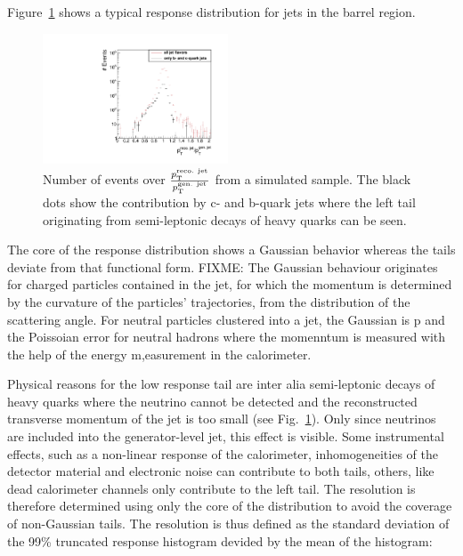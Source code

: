 \mbox{Figure~\ref{res:fig:TypicalResponse}} shows a typical response distribution for jets in the barrel region.
\begin{figure}[b]
  \centering
      \includegraphics[width=0.49\textwidth]{figures/resolution/generalApproach/intrinsicExampleContributionofBCQuarks.pdf}
  \caption{Number of events over $\frac{p_{\text{T}}^{\text{reco. jet}}}{p_{\text{T}}^{\text{gen. jet}}}$ from a simulated \GAMJET sample. 
           The black dots show the contribution by c- and b-quark jets where the left tail originating from semi-leptonic decays of heavy quarks can be seen.}  
  \label{res:fig:TypicalResponse}
\end{figure}
The core of the response distribution shows a Gaussian behavior whereas the tails deviate from that functional form.
FIXME: The Gaussian behaviour originates for charged particles contained in the jet, for which the momentum is determined by the curvature of the particles' trajectories, from the distribution of the scattering angle. 
For neutral particles clustered into a jet, the Gaussian is p and the Poissoian error for neutral hadrons where the momenntum is measured with the help of the energy m,easurement in the calorimeter.

Physical reasons for the low response tail are inter alia semi-leptonic decays of heavy quarks where the neutrino cannot be detected and the reconstructed transverse momentum of the jet is too small (see \mbox{Fig.~\ref{res:fig:TypicalResponse}}). 
Only since neutrinos are included into the generator-level jet, this effect is visible.
Some instrumental effects, such as a non-linear response of the calorimeter, inhomogeneities of the detector material and electronic noise can contribute to both tails, 
others, like dead calorimeter channels only contribute to the left tail. 
The resolution is therefore determined using only the core of the distribution to avoid the coverage of non-Gaussian tails.
The resolution is thus defined as the standard deviation of the 99\% truncated response histogram devided by the mean of the histogram:

